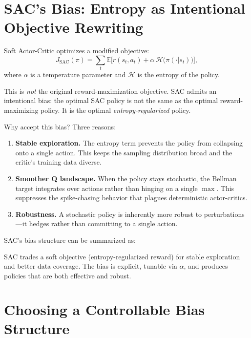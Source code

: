 \section{SAC's Bias: Entropy as Intentional Objective Rewriting}
\label{sec:sac-bias}

Soft Actor-Critic optimizes a modified objective:
\begin{equation}
  J_{\text{SAC}}(\pi) = \sum_t \mathbb{E}\!\bigl[
    r(s_t, a_t) + \alpha\,\mathcal{H}\!\bigl(\pi(\cdot|s_t)\bigr)
  \bigr],
\end{equation}
where $\alpha$ is a temperature parameter and $\mathcal{H}$ is the entropy of
the policy.

This is \emph{not} the original reward-maximization objective.  SAC admits an
intentional bias: the optimal SAC policy is not the same as the optimal
reward-maximizing policy.  It is the optimal \emph{entropy-regularized} policy.

Why accept this bias?  Three reasons:
\begin{enumerate}[nosep]
  \item \textbf{Stable exploration.}  The entropy term prevents the policy from
    collapsing onto a single action.  This keeps the sampling distribution broad
    and the critic's training data diverse.
  \item \textbf{Smoother Q landscape.}  When the policy stays stochastic, the
    Bellman target integrates over actions rather than hinging on a single
    $\max$.  This suppresses the spike-chasing behavior that plagues
    deterministic actor-critics.
  \item \textbf{Robustness.}  A stochastic policy is inherently more robust to
    perturbations---it hedges rather than committing to a single action.
\end{enumerate}

SAC's bias structure can be summarized as:

\begin{keyidea}
SAC trades a soft objective (entropy-regularized reward) for stable exploration
and better data coverage.  The bias is explicit, tunable via $\alpha$, and
produces policies that are both effective and robust.
\end{keyidea}


\section{Choosing a Controllable Bias Structure}
\label{sec:choosing-bias}

